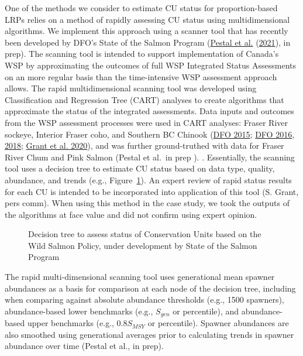 \documentclass[11pt]{book}
\begin{document}
One of the methods we consider to estimate CU status for proportion-based LRPs relies on a method of rapidly assessing CU status using multidimensional algorithms. We implement this approach using a scanner tool that has recently been developed by DFO's State of the Salmon Program (\protect\hyperlink{ref-pestalAlgorithmsRapidStatus2021}{Pestal et al.} (\protect\hyperlink{ref-pestalAlgorithmsRapidStatus2021}{2021}), in prep). The scanning tool is intended to support implementation of Canada's WSP by approximating the outcomes of full WSP Integrated Status Assessments on an more regular basis than the time-intensive WSP assessment approach allows. The rapid multidimensional scanning tool was developed using Classification and Regression Tree (CART) analyses to create algorithms that approximate the status of the integrated assessments. Data inputs and outcomes from the WSP assessment processes were used in CART analyses: Fraser River sockeye, Interior Fraser coho, and Southern BC Chinook (\protect\hyperlink{ref-dfoWildSalmonPolicy2015}{DFO 2015}; \protect\hyperlink{ref-dfoIntegratedBiologicalStatus2016}{DFO 2016}, \protect\hyperlink{ref-dfo2017FraserSockeye2018}{2018}; \protect\hyperlink{ref-grant2017FraserSockeye2020}{Grant et al. 2020}), and was further ground-truthed with data for Fraser River Chum and Pink Salmon (Pestal et al.~in prep ). . Essentially, the scanning tool uses a decision tree to estimate CU status based on data type, quality, abundance, and trends (e.g., Figure~\ref{fig:decision-tree}). An expert review of rapid status results for each CU is intended to be incorporated into application of this tool (S. Grant, pers comm). When using this method in the case study, we took the outputs of the algorithms at face value and did not confirm using expert opinion.
\begin{figure}[htb]

{\centering {} 

}

\caption{Decision tree to assess status of Conservation Units based on the Wild Salmon Policy, under development by State of the Salmon Program}\label{fig:decision-tree}
\end{figure}
The rapid multi-dimensional scanning tool uses generational mean spawner abundances as a basis for comparison at each node of the decision tree, including when comparing against absolute abundance thresholds (e.g., 1500 spawners), abundance-based lower benchmarks (e.g., \(S_{gen}\) or percentile), and abundance-based upper benchmarks (e.g., 0.8\(S_{MSY}\) or percentile). Spawner abundances are also smoothed using generational averages prior to calculating trends in spawner abundance over time (Pestal et al., in prep).
\end{document}
